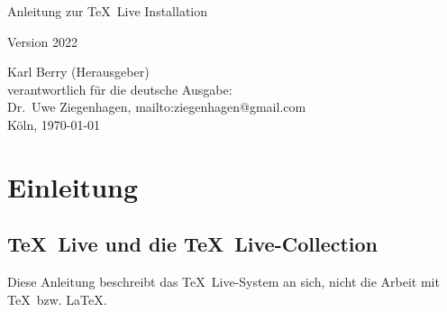 \documentclass[12pt,ngerman,a4paper,fullparskip]{report}
\newcommand{\tlcurrentyear}{2022}
\newcommand{\TL}{\TeX\ Live\xspace}
\newcommand{\href}[2]{#1}
\begin{document}
\begin{titlepage}

\begin{center}
\vspace*{3cm}

 \Huge Anleitung zur \TL Installation \vspace*{1cm}

\Large Version \tlcurrentyear

\end{center}

\vfill \noindent Karl Berry (Herausgeber) \\
verantwortlich für die deutsche Ausgabe:\\ 
Dr.~Uwe Ziegenhagen, \href{mailto:ziegenhagen@gmail.com}{ziegenhagen@gmail.com} \\
Köln, \today
\end{titlepage}


\tableofcontents



\listoffigures



%
%


\chapter{Einleitung}\label{sec:intro}
\section{\TL und die \TL-Collection}

Diese Anleitung beschreibt das \TL-System an sich, nicht die Arbeit mit \TeX\ bzw. \LaTeX. 
\end{document}
